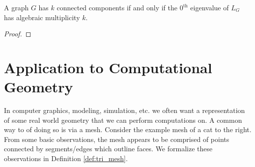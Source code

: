 \documentclass[12pt]{article}
\begin{document}
\begin{theorem}
    A graph $G$ has $k$ connected components if and only if the $0^\text{th}$ eigenvalue of $L_G$ has algebraic multiplicity $k$.
\end{theorem}

\begin{proof}
    
\end{proof}

\section{Application to Computational Geometry}
\begin{figure}
    \centering
\end{figure}

In computer graphics, modeling, simulation, etc. we often want a representation of some real world geometry that we can perform computations on. A common way to of doing so is via a mesh. Consider the example mesh of a cat to the right. From some basic observations, the mesh appears to be comprised of points connected by segments/edges which outline faces. We formalize these observations in Definition \ref{def:tri_mesh}.
\end{document}
